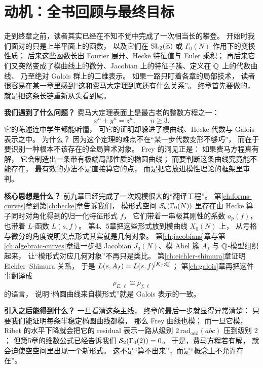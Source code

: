 \section{动机：全书回顾与最终目标}
\label{sec:ch10-motivation}

走到终章之前，读者其实已经在不知不觉中完成了一次相当长的攀登。
开始时我们面对的只是上半平面上的函数，
以及它们在 $\mathrm{SL}_2(\mathbb{Z})$ 或 $\Gamma_0(N)$ 作用下的变换性质；
后来这些函数长出 Fourier 展开、Hecke 特征值与 Euler 乘积；
再后来它们又突然变成了模曲线上的微分、Jacobian 上的特征子簇、定义在 $\mathbb{Q}$ 上的代数曲线、
乃至绝对 Galois 群上的二维表示。
如果一路只盯着各章的局部技术，
读者很容易在某一章里感到“这和费马大定理到底还有什么关系”。
终章首先要做的，
就是把这条长链重新从头看到尾。

\textbf{我们遇到了什么问题？}
费马大定理表面上是最古老的整数方程之一：
\[
  x^n+y^n=z^n,
  \qquad n\ge 3.
\]
它的陈述连中学生都能听懂，
可它的证明却躲进了模曲线、Hecke 代数与 Galois 表示之中。
为什么？
因为这个定理的难点不在“某一步代数变形不够巧”，
而在于要识别一种根本不该存在的全局算术对象。
Frey 的洞见正是：
如果费马方程真有解，
它会制造出一条带有极端局部性质的椭圆曲线；
而要判断这条曲线究竟能不能存在，
最有效的办法不是直接算它的点，
而是把它放进模性理论的框架里审判。

\textbf{核心思想是什么？}
前九章已经完成了一次规模很大的“翻译工程”。
第\ref{ch:forms-curves}章到第\ref{ch:hecke}章告诉我们，
模形式空间 $\mathcal{S}_k(\Gamma_0(N))$ 里存在由 Hecke 算子同时对角化得到的归一化特征形式 $f$，
它们带着一串极其刚性的系数 $a_p(f)$，也带着 $L$-函数 $L(s,f)$。
第4、5章把这些形式放到模曲线 $X_0(N)$ 上，
从亏格与微分的角度说明尖点形式其实就是几何对象。
第\ref{ch:jacobians}章与第\ref{ch:algebraic-curves}章进一步把 Jacobian $J_0(N)$、模 Abel 簇 $A_f$ 与 $\mathbb{Q}$-模型组织起来，
让“模形式对应几何对象”不再只是类比。
第\ref{ch:eichler-shimura}章证明 Eichler--Shimura 关系，
于是 $L(s,A_f)=L(s,f)^{[K_f:\mathbb{Q}]}$；
第\ref{ch:galois}章再把这件事翻译成
\[
  \rho_{E,\ell}\cong \rho_{f,\ell}
\]
的语言，
说明“椭圆曲线来自模形式”就是 Galois 表示的一致。

\textbf{引入之后能得到什么？}
一旦看清这条主线，
终章的最后一步就显得异常清楚：
只要我们能证明每条半稳定椭圆曲线都模，
那么 Frey 曲线也模；
而一旦它模，Ribet 的水平下降就会把它的 residual 表示一路从级别 $2\,\mathrm{rad}_{\mathrm{odd}}(abc)$ 压到级别 $2$；
但第5章的维数公式已经告诉我们 $\mathcal{S}_2(\Gamma_0(2))=0$。
于是，费马方程若有解，
就会迫使空空间里出现一个新形式。
这不是“算不出来”，而是“概念上不允许存在”。

